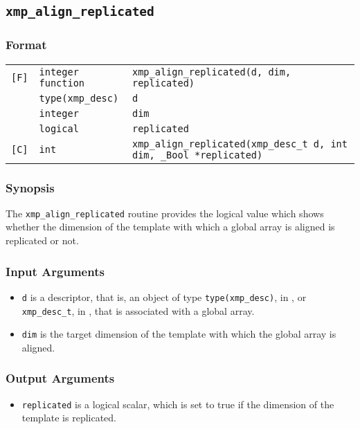 \subsection{\tt xmp\_align\_replicated}

\subsubsection*{Format}

\begin{tabular}{lll}

\verb![F]!& {\tt integer function}& {\tt xmp\_align\_replicated(d, dim, replicated)}\\
          & {\tt type(xmp\_desc)} & {\tt d}\\
          & {\tt integer} & {\tt dim}\\
          & {\tt logical} & {\tt replicated}\\

\verb![C]!&  {\tt int}& {\tt xmp\_align\_replicated(xmp\_desc\_t d, int dim, \_Bool *replicated)}\\

\end{tabular}

\subsubsection*{Synopsis}

The {\tt xmp\_align\_replicated} routine provides the logical value
which shows whether the dimension of the template with which a global
array is aligned is replicated or not. 


\subsubsection*{Input Arguments}
\begin{itemize}
 \item {\tt d} is a descriptor, that is, an object of type 
       {\tt type(xmp\_desc)}, in {\XMPF}, or {\tt xmp\_desc\_t},
       in {\XMPC}, that is associated with a global array.
 \item {\tt dim} is the target dimension of the template with which the
       global array is aligned.
\end{itemize}

\subsubsection*{Output Arguments}
\begin{itemize}
 \item {\tt replicated} is a logical scalar, which is set to true if the
       dimension of the template is replicated.

\end{itemize}


